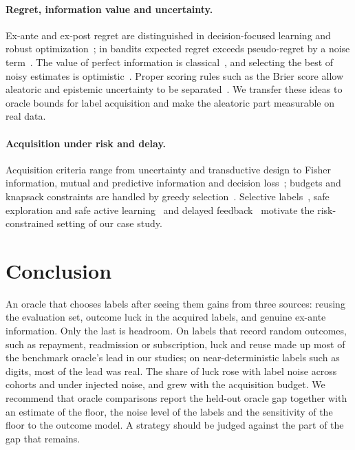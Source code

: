 \documentclass[runningheads]{llncs}
\begin{document}
\paragraph{Regret, information value and uncertainty.} Ex-ante and ex-post regret are distinguished in decision-focused learning and robust optimization~\cite{schutte2023robust}; in bandits expected regret exceeds pseudo-regret by a noise term~\cite{bubeck2012regret,audibert2010regret}. The value of perfect information is classical~\cite{howard1966information,raiffa1961applied}, and selecting the best of noisy estimates is optimistic~\cite{smith2006optimizer,cawley2010overfitting}. Proper scoring rules such as the Brier score allow aleatoric and epistemic uncertainty to be separated~\cite{hofman2024quantifying}. We transfer these ideas to oracle bounds for label acquisition and make the aleatoric part measurable on real data.

\paragraph{Acquisition under risk and delay.} Acquisition criteria range from uncertainty and transductive design to Fisher information, mutual and predictive information and decision loss~\cite{cohn1996active,settles2009active,lewis1994sequential,yu2006transductive,ash2021fishing,kirsch2019batchbald,bickfordsmith2023prediction,huang2026loss,chaloner1995bayesian}; budgets and knapsack constraints are handled by greedy selection~\cite{krause2005near,sviridenko2004note,tomanek2010cost}. Selective labels~\cite{lakkaraju2017selective,wei2021selective,kilbertus2020fair,keswani2024partial,crook2004reject}, safe exploration and safe active learning~\cite{sui2015safe,schreiter2015safe,wu2016conservative} and delayed feedback~\cite{joulani2013delayed,chapelle2014delayed,pham2022latency} motivate the risk-constrained setting of our case study.

\section{Conclusion}
\label{sec:conclusion}
An oracle that chooses labels after seeing them gains from three sources: reusing the evaluation set, outcome luck in the acquired labels, and genuine ex-ante information. Only the last is headroom. On labels that record random outcomes, such as repayment, readmission or subscription, luck and reuse made up most of the benchmark oracle's lead in our studies; on near-deterministic labels such as digits, most of the lead was real. The share of luck rose with label noise across cohorts and under injected noise, and grew with the acquisition budget. We recommend that oracle comparisons report the held-out oracle gap together with an estimate of the floor, the noise level of the labels and the sensitivity of the floor to the outcome model. A strategy should be judged against the part of the gap that remains.
\end{document}
